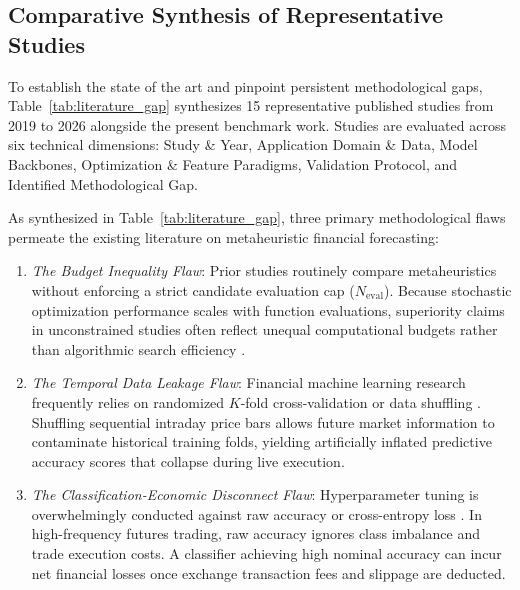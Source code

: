 \subsection{Comparative Synthesis of Representative Studies}\label{subsec:comparative_synthesis}

To establish the state of the art and pinpoint persistent methodological gaps, Table~\ref{tab:literature_gap} synthesizes 15 representative published studies from 2019 to 2026 alongside the present benchmark work. Studies are evaluated across six technical dimensions: Study \& Year, Application Domain \& Data, Model Backbones, Optimization \& Feature Paradigms, Validation Protocol, and Identified Methodological Gap.

As synthesized in Table~\ref{tab:literature_gap}, three primary methodological flaws permeate the existing literature on metaheuristic financial forecasting:
\begin{enumerate}
    \item \textit{The Budget Inequality Flaw}: Prior studies routinely compare metaheuristics without enforcing a strict candidate evaluation cap ($N_{\mathrm{eval}}$). Because stochastic optimization performance scales with function evaluations, superiority claims in unconstrained studies often reflect unequal computational budgets rather than algorithmic search efficiency \cite{dhingra2025solar, ecer2020mlp_ga_pso}.
    \item \textit{The Temporal Data Leakage Flaw}: Financial machine learning research frequently relies on randomized $K$-fold cross-validation or data shuffling \cite{simatupang2026stock, makridakis2018statistical}. Shuffling sequential intraday price bars allows future market information to contaminate historical training folds, yielding artificially inflated predictive accuracy scores that collapse during live execution.
    \item \textit{The Classification-Economic Disconnect Flaw}: Hyperparameter tuning is overwhelmingly conducted against raw accuracy or cross-entropy loss \cite{chicco2020mcc, anonymous2025precursor}. In high-frequency futures trading, raw accuracy ignores class imbalance and trade execution costs. A classifier achieving high nominal accuracy can incur net financial losses once exchange transaction fees and slippage are deducted.
\end{enumerate}

